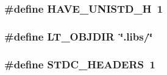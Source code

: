 \subsubsection[{HAVE\_\-UNISTD\_\-H}]{\setlength{\rightskip}{0pt plus 5cm}\#define HAVE\_\-UNISTD\_\-H~1}\label{config__coil_8h_a219b06937831d0da94d801ab13987639}
\subsubsection[{LT\_\-OBJDIR}]{\setlength{\rightskip}{0pt plus 5cm}\#define LT\_\-OBJDIR~\char`\"{}.libs/\char`\"{}}\label{config__coil_8h_ac2d5925d76379847dd9fc4747b061659}
\subsubsection[{STDC\_\-HEADERS}]{\setlength{\rightskip}{0pt plus 5cm}\#define STDC\_\-HEADERS~1}\label{config__coil_8h_a550e5c272cc3cf3814651721167dcd23}
